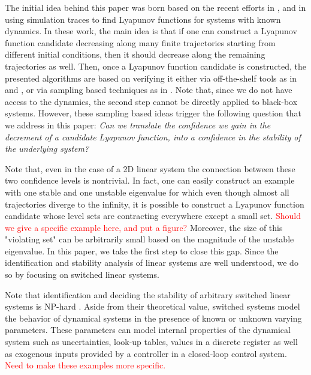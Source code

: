 The initial idea behind this paper was born based on the recent efforts in \cite{topcu}, \cite{kapinski} and \cite{lazar} in using simulation traces to find Lyapunov functions for systems with known dynamics. In these work, the main idea is that if one can construct a Lyapunov function candidate decreasing along many finite trajectories starting from different initial conditions, then it should decrease along the remaining trajectories as well. Then, once a Lyapunov function candidate is constructed, the presented algorithms are based on verifying it either via off-the-shelf tools as in \cite{topcu} and \cite{kapinski}, or via sampling based techniques as in \cite{lazar}. Note that, since we do not have access to the dynamics, the second step cannot be directly applied to black-box systems. However, these sampling based ideas trigger the following question that we address in this paper: \emph{Can we translate the confidence we gain in the decrement of a candidate Lyapunov function, into a confidence in the stability of the underlying system?} 

Note that, even in the case of a 2D linear system the connection between these two confidence levels is nontrivial. In fact, one can easily construct an example with one stable and one unstable eigenvalue for which even though almost all trajectories diverge to the infinity, it is possible to construct a Lyapunov function candidate whose level sets are contracting everywhere except a small set. \textcolor{red}{Should we give a specific example here, and put a figure?} Moreover, the size of this "violating set" can be arbitrarily small based on the magnitude of the unstable eigenvalue. In this paper, we take the first step to close this gap. Since the identification and stability analysis of linear systems are well understood, we do so by focusing on switched linear systems.

Note that identification and deciding the stability of arbitrary switched linear systems is NP-hard \cite{jungersBook}. Aside from their theoretical value, switched systems model the behavior of dynamical systems in the presence of known or unknown varying parameters. These parameters can model internal properties of the dynamical system such as uncertainties, look-up tables, values in a discrete register as well as exogenous inputs provided by a controller in a closed-loop control system. \textcolor{red}{Need to make these examples more specific.}

